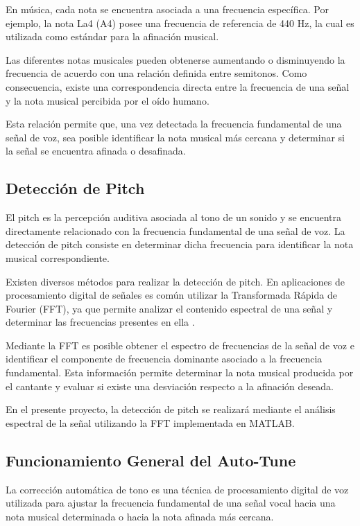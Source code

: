 \documentclass[12pt]{article}
\begin{document}
En música, cada nota se encuentra asociada a una frecuencia específica. Por ejemplo, la nota La4 (A4) posee una frecuencia de referencia de 440 Hz, la cual es utilizada como estándar para la afinación musical.

Las diferentes notas musicales pueden obtenerse aumentando o disminuyendo la frecuencia de acuerdo con una relación definida entre semitonos. Como consecuencia, existe una correspondencia directa entre la frecuencia de una señal y la nota musical percibida por el oído humano.

Esta relación permite que, una vez detectada la frecuencia fundamental de una señal de voz, sea posible identificar la nota musical más cercana y determinar si la señal se encuentra afinada o desafinada.



\subsection{Detección de Pitch}

El pitch es la percepción auditiva asociada al tono de un sonido y se encuentra directamente relacionado con la frecuencia fundamental de una señal de voz. La detección de pitch consiste en determinar dicha frecuencia para identificar la nota musical correspondiente.

Existen diversos métodos para realizar la detección de pitch. En aplicaciones de procesamiento digital de señales es común utilizar la Transformada Rápida de Fourier (FFT), ya que permite analizar el contenido espectral de una señal y determinar las frecuencias presentes en ella \cite{fft}.

Mediante la FFT es posible obtener el espectro de frecuencias de la señal de voz e identificar el componente de frecuencia dominante asociado a la frecuencia fundamental. Esta información permite determinar la nota musical producida por el cantante y evaluar si existe una desviación respecto a la afinación deseada.

En el presente proyecto, la detección de pitch se realizará mediante el análisis espectral de la señal utilizando la FFT implementada en MATLAB.



\subsection{Funcionamiento General del Auto-Tune}

La corrección automática de tono es una técnica de procesamiento digital de voz utilizada para ajustar la frecuencia fundamental de una señal vocal hacia una nota musical determinada o hacia la nota afinada más cercana.
\end{document}
